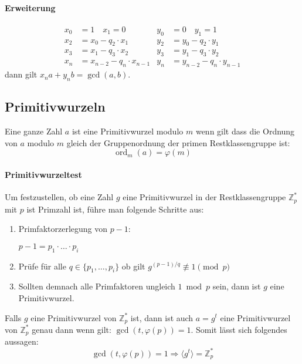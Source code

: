 \documentclass[a4paper,landscape]{article}
\newcommand{\ord}{\operatorname{ord}}
\begin{document}
\begin{multicols*}{4}
	\paragraph{Erweiterung}
	{\small
		\begin{align*}
			x_{0} & = 1 \quad x_{1} = 0             & y_{0} & = 0 \quad y_{1} = 1             \\
			x_{2} & = x_{0} - q_{2} \cdot x_{1}     & y_{2} & = y_{0} - q_{2} \cdot y_{1}     \\
			x_{3} & = x_{1} - q_{3} \cdot x_{2}     & y_{3} & = y_{1} - q_{3} \cdot y_{2}     \\
			x_{n} & = x_{n-2} - q_{n} \cdot x_{n-1} & y_{n} & = y_{n-2} - q_{n} \cdot y_{n-1}
		\end{align*}}
	dann gilt $x_{n}a + y_{n}b = \gcd(a,b)$.

	\subsection{Primitivwurzeln}
	Eine ganze Zahl \(a\) ist eine Primitivwurzel modulo \(m\) wenn gilt dass
	die Ordnung von \(a\) modulo \(m\) gleich der Gruppenordnung der primen
	Restklassengruppe ist: \[\ord_m(a)=\varphi(m)\]

	\paragraph{Primitivwurzeltest} Um festzustellen, ob eine Zahl \(g\) eine
	Primitivwurzel in der Restklassengruppe \(\mathbb{Z}_{p}^{*}\) mit \(p\) ist
	Primzahl ist, führe man folgende Schritte aus:
	\begin{enumerate}
		\item Primfaktorzerlegung von \(p-1\):\par
		      \(p-1 = p_{1} \cdot \ldots \cdot p_{i}\)
		\item Prüfe für alle \(q \in \{p_{1},\ldots, p_{i}\}\) ob gilt
		      \(g^{(p-1)/q} \not\equiv 1 \pmod{p}\) \par
		\item Sollten demnach alle Primfaktoren ungleich \(1 \bmod p\) sein, dann
		      ist \(g\) eine Primitivwurzel.
	\end{enumerate}

	Falls \(g\) eine Primitivwurzel von \(\mathbb{Z}_{p}^{*}\) ist, dann ist auch
	\(a = g^{t}\) eine Primitivwurzel von \(\mathbb{Z}_{p}^{*}\) genau dann wenn
	gilt: \(\gcd(t,\varphi(p)) = 1\). Somit lässt sich folgendes aussagen:
	\[\gcd(t,\varphi(p)) = 1 \Rightarrow \langle g^{t} \rangle = \mathbb{Z}_{p}^{*}\]


\end{multicols*}
\end{document}
